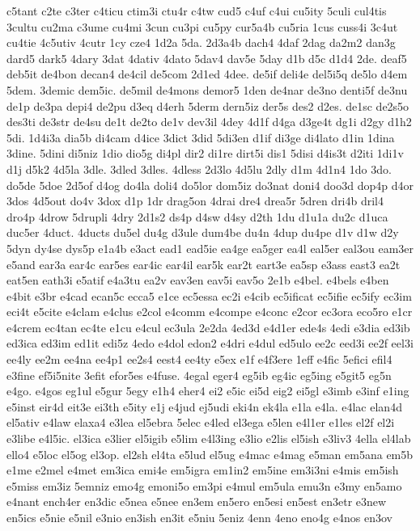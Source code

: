 {c5tant
c2te
c3ter
c4ticu
ctim3i
ctu4r
c4tw
cud5
c4uf
c4ui
cu5ity
5culi
cul4tis
3cultu
cu2ma
c3ume
cu4mi
3cun
cu3pi
cu5py
cur5a4b
cu5ria
1cus
cuss4i
3c4ut
cu4tie
4c5utiv
4cutr
1cy
cze4
1d2a
5da.
2d3a4b
dach4
4daf
2dag
da2m2
dan3g
dard5
dark5
4dary
3dat
4dativ
4dato
5dav4
dav5e
5day
d1b
d5c
d1d4
2de.
deaf5
deb5it
de4bon
decan4
de4cil
de5com
2d1ed
4dee.
de5if
deli4e
del5i5q
de5lo
d4em
5dem.
3demic
dem5ic.
de5mil
de4mons
demor5
1den
de4nar
de3no
denti5f
de3nu
de1p
de3pa
depi4
de2pu
d3eq
d4erh
5derm
dern5iz
der5s
des2
d2es.
de1sc
de2s5o
des3ti
de3str
de4su
de1t
de2to
de1v
dev3il
4dey
4d1f
d4ga
d3ge4t
dg1i
d2gy
d1h2
5di.
1d4i3a
dia5b
di4cam
d4ice
3dict
3did
5di3en
d1if
di3ge
di4lato
d1in
1dina
3dine.
5dini
di5niz
1dio
dio5g
di4pl
dir2
di1re
dirt5i
dis1
5disi
d4is3t
d2iti
1di1v
d1j
d5k2
4d5la
3dle.
3dled
3dles.
4dless
2d3lo
4d5lu
2dly
d1m
4d1n4
1do
3do.
do5de
5doe
2d5of
d4og
do4la
doli4
do5lor
dom5iz
do3nat
doni4
doo3d
dop4p
d4or
3dos
4d5out
do4v
3dox
d1p
1dr
drag5on
4drai
dre4
drea5r
5dren
dri4b
dril4
dro4p
4drow
5drupli
4dry
2d1s2
ds4p
d4sw
d4sy
d2th
1du
d1u1a
du2c
d1uca
duc5er
4duct.
4ducts
du5el
du4g
d3ule
dum4be
du4n
4dup
du4pe
d1v
d1w
d2y
5dyn
dy4se
dys5p
e1a4b
e3act
ead1
ead5ie
ea4ge
ea5ger
ea4l
eal5er
eal3ou
eam3er
e5and
ear3a
ear4c
ear5es
ear4ic
ear4il
ear5k
ear2t
eart3e
ea5sp
e3ass
east3
ea2t
eat5en
eath3i
e5atif
e4a3tu
ea2v
eav3en
eav5i
eav5o
2e1b
e4bel.
e4bels
e4ben
e4bit
e3br
e4cad
ecan5c
ecca5
e1ce
ec5essa
ec2i
e4cib
ec5ificat
ec5ifie
ec5ify
ec3im
eci4t
e5cite
e4clam
e4clus
e2col
e4comm
e4compe
e4conc
e2cor
ec3ora
eco5ro
e1cr
e4crem
ec4tan
ec4te
e1cu
e4cul
ec3ula
2e2da
4ed3d
e4d1er
ede4s
4edi
e3dia
ed3ib
ed3ica
ed3im
ed1it
edi5z
4edo
e4dol
edon2
e4dri
e4dul
ed5ulo
ee2c
eed3i
ee2f
eel3i
ee4ly
ee2m
ee4na
ee4p1
ee2s4
eest4
ee4ty
e5ex
e1f
e4f3ere
1eff
e4fic
5efici
efil4
e3fine
ef5i5nite
3efit
efor5es
e4fuse.
4egal
eger4
eg5ib
eg4ic
eg5ing
e5git5
eg5n
e4go.
e4gos
eg1ul
e5gur
5egy
e1h4
eher4
ei2
e5ic
ei5d
eig2
ei5gl
e3imb
e3inf
e1ing
e5inst
eir4d
eit3e
ei3th
e5ity
e1j
e4jud
ej5udi
eki4n
ek4la
e1la
e4la.
e4lac
elan4d
el5ativ
e4law
elaxa4
e3lea
el5ebra
5elec
e4led
el3ega
e5len
e4l1er
e1les
el2f
el2i
e3libe
e4l5ic.
el3ica
e3lier
el5igib
e5lim
e4l3ing
e3lio
e2lis
el5ish
e3liv3
4ella
el4lab
ello4
e5loc
el5og
el3op.
el2sh
el4ta
e5lud
el5ug
e4mac
e4mag
e5man
em5ana
em5b
e1me
e2mel
e4met
em3ica
emi4e
em5igra
em1in2
em5ine
em3i3ni
e4mis
em5ish
e5miss
em3iz
5emniz
emo4g
emoni5o
em3pi
e4mul
em5ula
emu3n
e3my
en5amo
e4nant
ench4er
en3dic
e5nea
e5nee
en3em
en5ero
en5esi
en5est
en3etr
e3new
en5ics
e5nie
e5nil
e3nio
en3ish
en3it
e5niu
5eniz
4enn
4eno
eno4g
e4nos
en3ov
}
